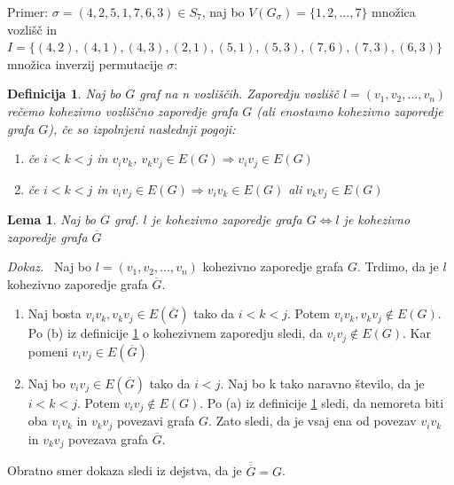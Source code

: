 \documentclass[a4paper, 12pt]{book}
\newtheorem{definicija}{Definicija}[chapter]
\newtheorem{lema}{Lema}[chapter]
\newenvironment{dokaz}{\emph{Dokaz.}\ }{\hspace{\fill}{$\Box$}}
\begin{document}
Primer: 
$\sigma = (4, 2, 5, 1, 7, 6, 3) \in S_7$, naj bo $V(G_{\sigma}) = \{ 1, 2, ..., 7\}$ množica vozlišč in $I = \{ (4, 2), (4, 1), (4, 3), (2, 1), (5, 1), (5, 3), (7, 6), (7, 3), (6, 3) \}$ množica inverzij permutacije $\sigma$:


\begin{definicija}
\label{def0}
    Naj bo $G$ graf na n vozliščih. Zaporedju vozlišč $l = (v_1, v_2, ..., v_n)$ rečemo kohezivno vozliščno zaporedje grafa $G$ (ali enostavno kohezivno zaporedje grafa $G$), če so izpolnjeni naslednji pogoji:
    \begin{enumerate}[label=(\alph*)]
        \item če $i < k < j$ in $v_iv_k$, $v_kv_j \in E(G) \Rightarrow v_iv_j \in E(G)$
        \item če $i < k < j$ in $v_iv_j \in E(G) \Rightarrow v_iv_k \in E(G)$ ali $v_kv_j \in E(G)$
    \end{enumerate}
\end{definicija}

\begin{lema}
\label{lema0}
    Naj bo $G$ graf. $l$ je kohezivno zaporedje grafa $G \Leftrightarrow l$ je kohezivno zaporedje grafa $\overline{G}$ 
\end{lema}
\begin{dokaz}
    Naj bo $l = (v_1, v_2, ..., v_n)$ kohezivno zaporedje grafa $G$. Trdimo, da je $l$ kohezivno zaporedje grafa $\overline{G}$. 
    \begin{enumerate}[label=(\alph*)]
        \item Naj bosta $v_iv_k, v_kv_j \in E(\overline{G})$ tako da $i < k < j$. Potem $v_iv_k, v_kv_j \notin E(G)$. Po (b) iz definicije \ref{def0} o kohezivnem zaporedju sledi, da $v_iv_j \notin E(G)$. Kar pomeni $v_iv_j \in E(\overline{G})$
        \item Naj bo $v_iv_j \in E(\overline{G})$ tako da $i < j$. Naj bo k tako naravno število, da je $i < k < j$. Potem $v_iv_j \notin E(G)$. Po (a) iz definicije \ref{def0} sledi, da nemoreta biti oba $v_iv_k$ in $v_kv_j$ povezavi grafa $G$. Zato sledi, da je vsaj ena od povezav $v_iv_k$ in $v_kv_j$ povezava grafa $\overline{G}$. 
    \end{enumerate}
    Obratno smer dokaza sledi iz dejstva, da je $\overline{\overline{G}} = G$.
\end{dokaz}
\end{document}
